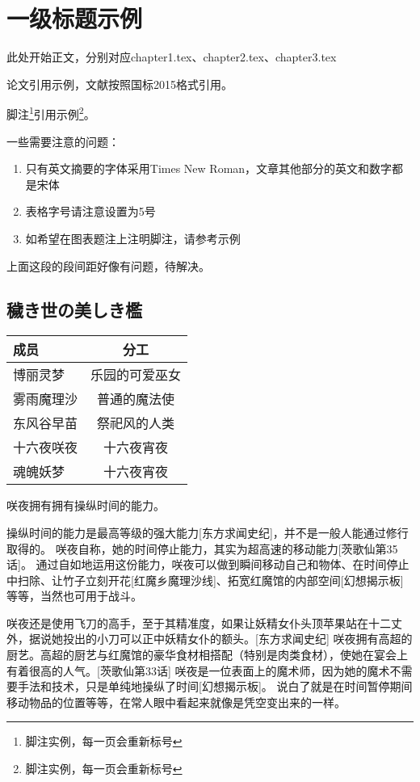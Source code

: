 \chapter{一级标题示例}
此处开始正文，分别对应chapter1.tex、chapter2.tex、chapter3.tex

论文引用示例\cite{王宣承-1}，文献按照国标2015格式引用。

脚注\footnote{脚注实例，每一页会重新标号}引用示例\footnote{脚注实例，每一页会重新标号}。

一些需要注意的问题：
\begin{enumerate}
    \item 只有英文摘要的字体采用Times New Roman，文章其他部分的英文和数字都是宋体
    \item 表格字号请注意设置为5号
    \item 如希望在图表题注上注明脚注，请参考示例
\end{enumerate}
上面这段的段间距好像有问题，待解决。

\section{穢き世の美しき檻}
\begin{table}[h]
    \centering
    \begin{tabular}{lc}
        \toprule[1.5pt]
        成员       & 分工                                        \\
        \midrule[1.0pt]
        博丽灵梦   & 乐园的可爱巫女            \\
        雾雨魔理沙 & 普通的魔法使 \\
        东风谷早苗 & 祭祀风的人类        \\
        十六夜咲夜 & 十六夜宵夜                      \\
        魂魄妖梦   & 十六夜宵夜            \\
        \bottomrule[1.5pt]
    \end{tabular}
\end{table}
咲夜拥有拥有操纵时间的能力。

操纵时间的能力是最高等级的强大能力[东方求闻史纪]，并不是一般人能通过修行取得的。
咲夜自称，她的时间停止能力，其实为超高速的移动能力[茨歌仙第35话]。
通过自如地运用这份能力，咲夜可以做到瞬间移动自己和物体、在时间停止中扫除、让竹子立刻开花[红魔乡魔理沙线]、拓宽红魔馆的内部空间[幻想揭示板]等等，当然也可用于战斗。

咲夜还是使用飞刀的高手，至于其精准度，如果让妖精女仆头顶苹果站在十二丈外，据说她投出的小刀可以正中妖精女仆的额头。[东方求闻史纪]
咲夜拥有高超的厨艺。高超的厨艺与红魔馆的豪华食材相搭配（特别是肉类食材），使她在宴会上有着很高的人气。[茨歌仙第33话]
咲夜是一位表面上的魔术师，因为她的魔术不需要手法和技术，只是单纯地操纵了时间[幻想揭示板]。 说白了就是在时间暂停期间移动物品的位置等等，在常人眼中看起来就像是凭空变出来的一样。
